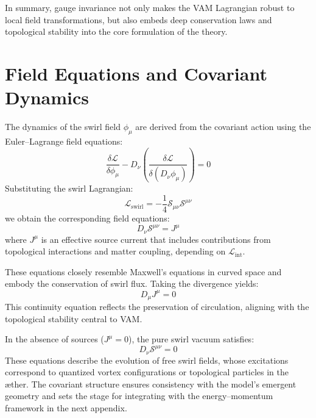 \documentclass[a4paper,12pt]{article}
\begin{document}
        In summary, gauge invariance not only makes the VAM Lagrangian robust to local field transformations, but also embeds deep conservation laws and topological stability into the core formulation of the theory.


    \section{Field Equations and Covariant Dynamics}
        The dynamics of the swirl field $\phi_\mu$ are derived from the covariant action using the Euler–Lagrange field equations:
        \begin{equation}
            \frac{\delta \mathcal{L}}{\delta \phi_\mu} - D_\nu \left( \frac{\delta \mathcal{L}}{\delta (D_\nu \phi_\mu)} \right) = 0
        \end{equation}
        Substituting the swirl Lagrangian:
        \begin{equation}
            \mathcal{L}_{\text{swirl}} = -\frac{1}{4} \mathcal{S}_{\mu\nu} \mathcal{S}^{\mu\nu}
        \end{equation}
        we obtain the corresponding field equations:
        \begin{equation}
            D_\nu \mathcal{S}^{\mu\nu} = J^\mu
        \end{equation}
        where $J^\mu$ is an effective source current that includes contributions from topological interactions and matter coupling, depending on $\mathcal{L}_{\text{int}}$.

        These equations closely resemble Maxwell’s equations in curved space and embody the conservation of swirl flux. Taking the divergence yields:
        \begin{equation}
            D_\mu J^\mu = 0
        \end{equation}
        This continuity equation reflects the preservation of circulation, aligning with the topological stability central to VAM.

        In the absence of sources ($J^\mu = 0$), the pure swirl vacuum satisfies:
        \begin{equation}
            D_\nu \mathcal{S}^{\mu\nu} = 0
        \end{equation}
        These equations describe the evolution of free swirl fields, whose excitations correspond to quantized vortex configurations or topological particles in the æther. The covariant structure ensures consistency with the model's emergent geometry and sets the stage for integrating with the energy–momentum framework in the next appendix.
\end{document}
